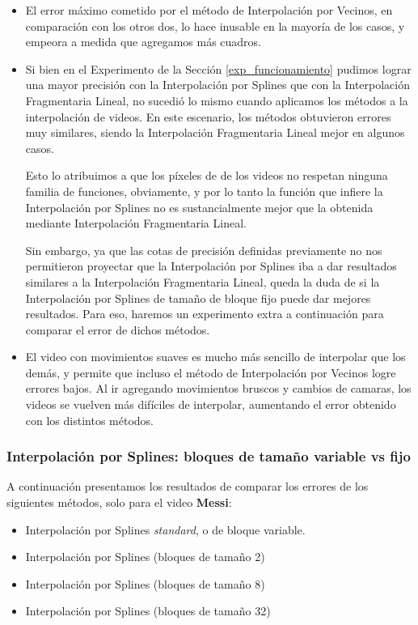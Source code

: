 \begin{itemize}
    \item El error máximo cometido por el método de Interpolación por Vecinos, en comparación
        con los otros dos, lo hace inusable en la mayoría de los casos, y empeora a medida
        que agregamos más cuadros.
    \item Si bien en el Experimento de la Sección \ref{exp_funcionamiento} pudimos lograr una
        mayor precisión con la Interpolación por Splines que con la Interpolación Fragmentaria Lineal,
        no sucedió lo mismo cuando aplicamos los métodos a la interpolación de videos.
        En este escenario, los métodos obtuvieron errores muy similares, siendo la Interpolación
        Fragmentaria Lineal mejor en algunos casos.

        Esto lo atribuimos a que los píxeles de de los videos no respetan ninguna familia de funciones,
        obviamente, y por lo tanto la función que infiere la Interpolación por Splines
        no es sustancialmente mejor que la obtenida mediante Interpolación Fragmentaria Lineal.

        Sin embargo, ya que las cotas de precisión definidas previamente no nos permitieron
        proyectar que la Interpolación por Splines iba a dar resultados similares a la
        Interpolación Fragmentaria Lineal, queda la duda de si la Interpolación por Splines
        de tamaño de bloque fijo puede dar mejores resultados. Para eso, haremos un
        experimento extra a continuación para comparar el error de dichos métodos.
    \item El video con movimientos suaves es mucho más sencillo de interpolar que los demás, y
        permite que incluso el método de Interpolación por Vecinos logre errores bajos.
        Al ir agregando movimientos bruscos y cambios de camaras, los videos se vuelven más
        difíciles de interpolar, aumentando el error obtenido con los distintos métodos.
\end{itemize}

\subsubsection{Interpolación por Splines: bloques de tamaño variable vs fijo}

A continuación presentamos los resultados de comparar los errores de los siguientes métodos, solo para el video \textbf{Messi}:
\begin{itemize}
    \item Interpolación por Splines \textit{standard}, o de bloque variable.
    \item Interpolación por Splines (bloques de tamaño 2)
    \item Interpolación por Splines (bloques de tamaño 8)
    \item Interpolación por Splines (bloques de tamaño 32)
\end{itemize}

